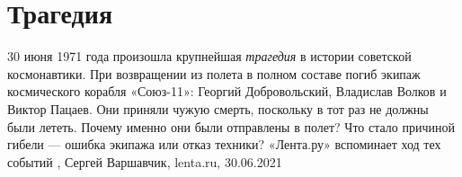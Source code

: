  
 
 
 
 
\chapter{Трагедия}
\label{sec:slova.tragedia}

30 июня 1971 года произошла крупнейшая \emph{трагедия} в истории советской
космонавтики. При возвращении из полета в полном составе погиб экипаж
космического корабля «Союз-11»: Георгий Добровольский, Владислав Волков и
Виктор Пацаев. Они приняли чужую смерть, поскольку в тот раз не должны были
лететь. Почему именно они были отправлены в полет? Что стало причиной гибели —
ошибка экипажа или отказ техники? «Лента.ру» вспоминает ход тех событий
,
Сергей Варшавчик, lenta.ru, 30.06.2021

